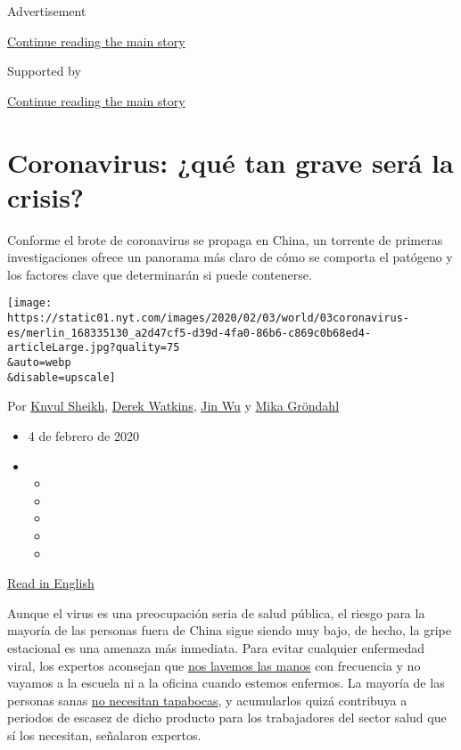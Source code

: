 Advertisement

\protect\hyperlink{after-top}{Continue reading the main story}

Supported by

\protect\hyperlink{after-sponsor}{Continue reading the main story}

\hypertarget{coronavirus-quuxe9-tan-grave-seruxe1-la-crisis}{%
\section{Coronavirus: ¿qué tan grave será la
crisis?}\label{coronavirus-quuxe9-tan-grave-seruxe1-la-crisis}}

Conforme el brote de coronavirus se propaga en China, un torrente de
primeras investigaciones ofrece un panorama más claro de cómo se
comporta el patógeno y los factores clave que determinarán si puede
contenerse.

\texttt{[image: https://static01.nyt.com/images/2020/02/03/world/03coronavirus-es/merlin\_168335130\_a2d47cf5-d39d-4fa0-86b6-c869c0b68ed4-articleLarge.jpg?quality=75\\\&auto=webp\\\&disable=upscale]}

Por \href{https://www.nytimes.com/by/knvul-sheikh}{Knvul Sheikh},
\href{https://www.nytimes.com/by/derek-watkins}{Derek Watkins},
\href{https://www.nytimes.com/by/jin-wu}{Jin Wu} y
\href{https://www.nytimes.com/by/mika-grondahl}{Mika Gröndahl}

\begin{itemize}
\item
  4 de febrero de 2020
\item
  \begin{itemize}
  \item
  \item
  \item
  \item
  \item
  \end{itemize}
\end{itemize}

\href{https://www.nytimes.com/interactive/2020/world/asia/china-coronavirus-contain.html}{Read
in English}

Aunque el virus es una preocupación seria de salud pública, el riesgo
para la mayoría de las personas fuera de China sigue siendo muy bajo, de
hecho, la gripe estacional es una amenaza más inmediata. Para evitar
cualquier enfermedad viral, los expertos aconsejan que
\href{https://www.nytimes.com/2020/01/28/opinion/coronavirus-prevention-tips.html}{nos
lavemos las manos} con frecuencia y no vayamos a la escuela ni a la
oficina cuando estemos enfermos. La mayoría de las personas sanas
\href{https://www.nytimes.com/2020/01/29/health/coronavirus-masks-hoarding.html}{no
necesitan tapabocas}, y acumularlos quizá contribuya a periodos de
escasez de dicho producto para los trabajadores del sector salud que sí
los necesitan, señalaron expertos.

